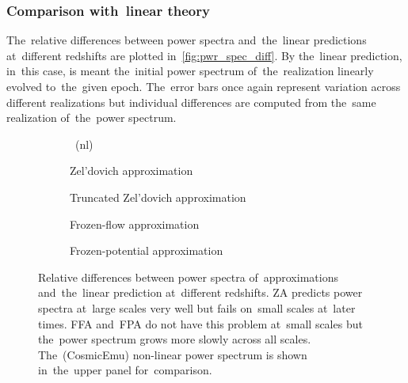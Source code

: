 \subsubsection{Comparison with~linear theory}
The~relative differences between power spectra and~the~linear predictions at~different redshifts are plotted in~\autoref{fig:pwr_spec_diff}. By the~linear prediction, in~this case, is meant the~initial power spectrum of~the~realization linearly evolved to~the~given epoch. The~error bars once again represent variation across different realizations but individual differences are computed from the~same realization of~the~power spectrum.
\begin{figure}[!hbt]
	\begin{adjustwidth}{-1cm}{-1cm}
	\centering
		\begin{subfigure}{1.0\linewidth}
		\end{subfigure}
		\begin{subfigure}{0.5\linewidth}
			\caption{\LCDM\ (nl)}	
		\end{subfigure}
		\begin{subfigure}{0.5\linewidth}
			\caption{Zel'dovich approximation}
		\end{subfigure}
		\begin{subfigure}{0.5\linewidth}
			\caption{Truncated Zel'dovich approximation}
		\end{subfigure}
		\begin{subfigure}{0.5\linewidth}
			\caption{Frozen-flow approximation}
		\end{subfigure}
		\begin{subfigure}{0.5\linewidth}
			\caption{Frozen-potential approximation}
		\end{subfigure}
	\end{adjustwidth}
	\caption{Relative differences between power spectra of~approximations and~the~linear prediction at~different redshifts. ZA predicts power spectra at~large scales very well but fails on~small scales at~later times. FFA and~FPA do not have this problem at~small scales but the~power spectrum grows more slowly across all scales. The~(CosmicEmu) non-linear power spectrum is shown in~the~upper panel for~comparison.}
	\label{fig:pwr_spec_diff}
\end{figure}

